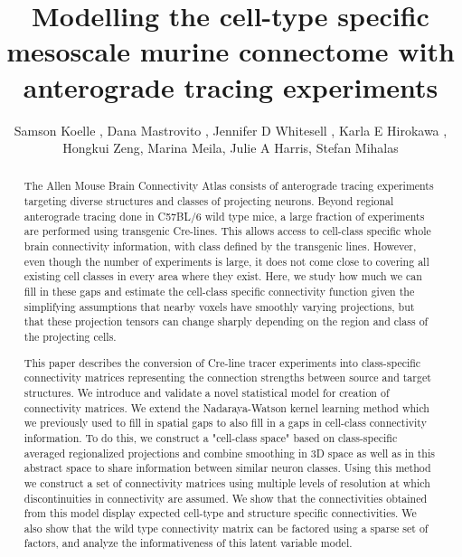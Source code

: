\documentclass[NETN,manuscript]{stjour-new}
\begin{document}
\title{Modelling the cell-type specific mesoscale murine connectome with anterograde tracing experiments}

\author[Koelle et al]%
{Samson Koelle , Dana Mastrovito , Jennifer D Whitesell , Karla E Hirokawa ,  Hongkui Zeng, Marina Meila, Julie A Harris, Stefan Mihalas}





\begin{abstract}
The Allen Mouse Brain Connectivity Atlas consists of anterograde tracing experiments targeting diverse structures and classes of projecting neurons.
Beyond regional anterograde tracing done in C57BL/6 wild type mice, a large fraction of experiments are performed using transgenic Cre-lines.
This allows access to cell-class specific whole brain connectivity information, with class defined by the transgenic lines.
However, even though the number of experiments is large, it does not come close to covering all existing cell classes in every area where they exist.
Here, we study how much we can fill in these gaps and estimate the cell-class specific connectivity function given the simplifying assumptions that nearby voxels have smoothly varying projections, but that these projection tensors can change sharply depending on the region and class of the projecting cells.

This paper describes the conversion of Cre-line tracer experiments into class-specific connectivity matrices representing the connection strengths between source and target structures.
We introduce and validate a novel statistical model for creation of connectivity matrices.
We extend the Nadaraya-Watson kernel learning method which we previously used to fill in spatial gaps to also fill in a gaps in cell-class connectivity information.
To do this, we construct a "cell-class space" based on class-specific averaged regionalized projections and combine smoothing in 3D space as well as in this abstract space to share information between similar neuron classes.
Using this method we construct a set of connectivity matrices using multiple levels of resolution at which discontinuities in connectivity are assumed. We show that the connectivities obtained from this model display expected cell-type and structure specific connectivities. 
We also show that the wild type connectivity matrix can be factored using a sparse set of factors, and analyze the informativeness of this latent variable model.

\end{abstract}
\end{document}
